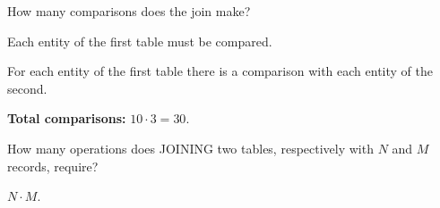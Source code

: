 \documentclass{beamer}
\begin{document}
\begin{slide}{
\item How many comparisons does the join make?
\pause
\item Each entity of the first table must be compared.
\item For each entity of the first table there is a comparison with each entity of the second.
\item \textbf{Total comparisons: }$10 \cdot 3 = 30$.
\item How many operations does JOINING two tables, respectively with $N$ and $M$ records, require?
\pause
\item $N \cdot M$.
}\end{slide}
\end{document}
